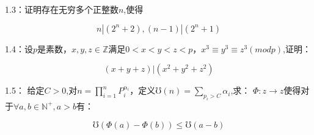 \documentclass{ctexart}
\begin{document}
1.3：证明存在无穷多个正整数$n$,使得
	
		\[
		n|(2^n+2),(n-1)|(2^n+1)
		\]

1.4：设$p$是素数，$x,y,z\in \mathbb{Z}$满足$0<x<y<z<p$，$x^3\equiv y^3\equiv z^3 (mod p)$,证明：
	
		\[
		(x+y+z)|(x^2+y^2+z^2)
		\]

1.5： 给定$C>0$,对$n=\displaystyle\prod_{i=1}^{n} P_{i}^{\alpha_{i}}$，定义$\mho(n)=\displaystyle\sum_{p_i>C} \alpha_{i}$,求：
$\Phi :z \rightarrow z$使得对于$\forall a,b\in \mathbb{N^{+}},a>b$有：

\[\mho (\Phi (a)-\Phi (b))\le \mho (a-b)\]

\end{document}
